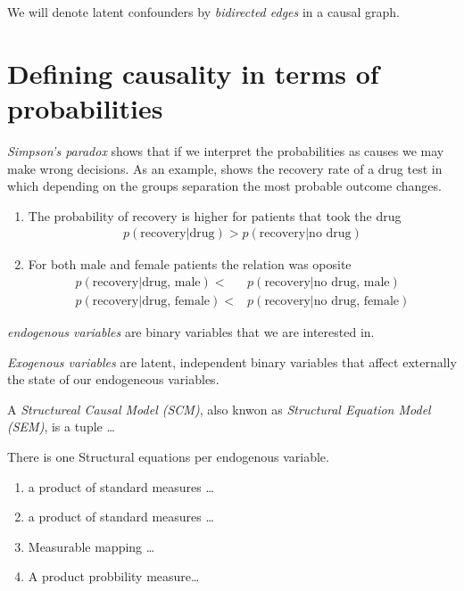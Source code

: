 \documentclass[b5paper]{report}
\begin{document}
We will denote latent confounders by \emph{bidirected edges} in a causal graph.

\section{Defining causality in terms of probabilities}

\emph{Simpson's paradox} shows that if we interpret the probabilities as causes
we may make wrong decisions. As an example, shows the recovery rate of a drug
test in which depending on the groups separation the most probable outcome
changes.

\begin{mybox}
\begin{enumerate}
  \item The probability of recovery is higher for patients that took the drug
    \begin{align}
      p(\text{recovery}|\text{drug}) > p(\text{recovery}|\text{no drug})
    \end{align}
  \item For both male and female patients the relation was oposite
    \begin{align}
      p(\text{recovery}|\text{drug, male}) <& p(\text{recovery}|\text{no drug,
      male}) \\
      p(\text{recovery}|\text{drug, female}) <& p(\text{recovery}|\text{no drug,
      female})
    \end{align}
\end{enumerate}
\end{mybox}

\emph{endogenous variables} are binary variables that we are interested in.

\emph{Exogenous variables} are latent, independent binary variables that affect
externally the state of our endogeneous variables.

A \emph{Structureal Causal Model (SCM)}, also knwon as \emph{Structural
Equation Model (SEM)}, is a tuple \dots

There is one Structural equations  per endogenous variable.

\begin{enumerate}
  \item a product of standard measures \dots
  \item a product of standard measures \dots
  \item Measurable mapping \dots
  \item A product probbility measure\dots
\end{enumerate}
\end{document}
